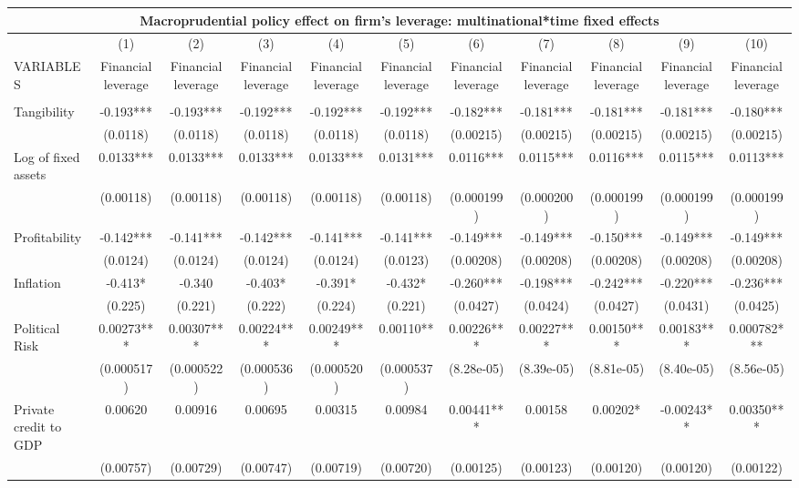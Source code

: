 \begin{tabular}{lcccccccccc}
\multicolumn{11}{c}{Macroprudential policy effect on firm's leverage: multinational*time fixed effects} \\ \hline
 & (1) & (2) & (3) & (4) & (5) & (6) & (7) & (8) & (9) & (10) \\
VARIABLES & Financial leverage & Financial leverage & Financial leverage & Financial leverage & Financial leverage & Financial leverage & Financial leverage & Financial leverage & Financial leverage & Financial leverage \\ \hline
 &  &  &  &  &  &  &  &  &  &  \\
Tangibility & -0.193*** & -0.193*** & -0.192*** & -0.192*** & -0.192*** & -0.182*** & -0.181*** & -0.181*** & -0.181*** & -0.180*** \\
 & (0.0118) & (0.0118) & (0.0118) & (0.0118) & (0.0118) & (0.00215) & (0.00215) & (0.00215) & (0.00215) & (0.00215) \\
Log of fixed assets & 0.0133*** & 0.0133*** & 0.0133*** & 0.0133*** & 0.0131*** & 0.0116*** & 0.0115*** & 0.0116*** & 0.0115*** & 0.0113*** \\
 & (0.00118) & (0.00118) & (0.00118) & (0.00118) & (0.00118) & (0.000199) & (0.000200) & (0.000199) & (0.000199) & (0.000199) \\
Profitability & -0.142*** & -0.141*** & -0.142*** & -0.141*** & -0.141*** & -0.149*** & -0.149*** & -0.150*** & -0.149*** & -0.149*** \\
 & (0.0124) & (0.0124) & (0.0124) & (0.0124) & (0.0123) & (0.00208) & (0.00208) & (0.00208) & (0.00208) & (0.00208) \\
Inflation & -0.413* & -0.340 & -0.403* & -0.391* & -0.432* & -0.260*** & -0.198*** & -0.242*** & -0.220*** & -0.236*** \\
 & (0.225) & (0.221) & (0.222) & (0.224) & (0.221) & (0.0427) & (0.0424) & (0.0427) & (0.0431) & (0.0425) \\
Political Risk & 0.00273*** & 0.00307*** & 0.00224*** & 0.00249*** & 0.00110** & 0.00226*** & 0.00227*** & 0.00150*** & 0.00183*** & 0.000782*** \\
 & (0.000517) & (0.000522) & (0.000536) & (0.000520) & (0.000537) & (8.28e-05) & (8.39e-05) & (8.81e-05) & (8.40e-05) & (8.56e-05) \\
Private credit to GDP & 0.00620 & 0.00916 & 0.00695 & 0.00315 & 0.00984 & 0.00441*** & 0.00158 & 0.00202* & -0.00243** & 0.00350*** \\
 & (0.00757) & (0.00729) & (0.00747) & (0.00719) & (0.00720) & (0.00125) & (0.00123) & (0.00120) & (0.00120) & (0.00122) \\

\end{tabular}
